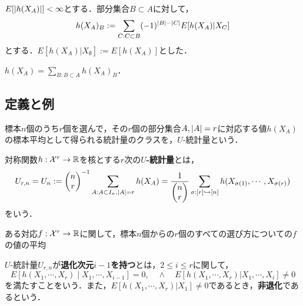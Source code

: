 \documentclass[uplatex,dvipdfmx]{jsreport}
\begin{document}
\begin{definition}
    $E[\lvert h(X_A)\rvert]<\infty$とする．部分集合$B\subset A$に対して，
    \[h(X_A)_B:=\sum_{C:C\subset B}(-1)^{\lvert B\rvert-\lvert C\rvert}E[h(X_A)|X_C]\]
    とする．$E[h(X_A)|X_{\emptyset}]:=E[h(X_A)]$とした．
\end{definition}

\begin{lemma}[反転公式]
    $h(X_A)=\sum_{B:B\subset A}h(X_A)_B$．
\end{lemma}

\subsection{定義と例}

\begin{tcolorbox}[colframe=ForestGreen, colback=ForestGreen!10!white,breakable,colbacktitle=ForestGreen!40!white,coltitle=black,fonttitle=\bfseries\sffamily,
title=]
    標本$n$個のうち$r$個を選んで，その$r$個の部分集合$A,\lvert A\rvert=r$に対応する値$h(X_A)$の標本平均として得られる統計量のクラスを，$U$-統計量という．
\end{tcolorbox}

\begin{definition}[U-statistic]
    対称関数$h:\mathcal{X}^r\to\mathbb{R}$を核とする$r$次の\textbf{$U$-統計量}とは，
    \[U_{r,n}=U_n:=\begin{pmatrix}n\\r\end{pmatrix}^{-1}\sum_{A:A\subset I_n,\lvert A\rvert=r}h(X_A)=\frac{1}{\begin{pmatrix}n\\r\end{pmatrix}}\sum_{\sigma:[r]\hookrightarrow[n]}h(X_{\sigma(1)},\cdots,X_{\sigma(r)})\]
    をいう．
\end{definition}
\begin{remarks}
    ある対応$f:\mathcal{X}^r\to\mathbb{R}$に関して，標本$n$個からの$r$個のすべての選び方についての$f$の値の平均
\end{remarks}

\begin{definition}
    $U$-統計量$U_{r,n}$が\textbf{退化次元$i-1$を持つ}とは，$2\le i\le r$に関して，
    \[E[h(X_1,\cdots,X_r)\mid X_1,\cdots,X_{i-1}]=0,\quad\land\quad E[h(X_1,\cdots,X_r)|X_1,\cdots,X_i]\ne0\]
    を満たすことをいう．また，$E[h(X_1,\cdots,X_r)|X_1]\ne0$であるとき，\textbf{非退化}であるという．
\end{definition}
\end{document}
